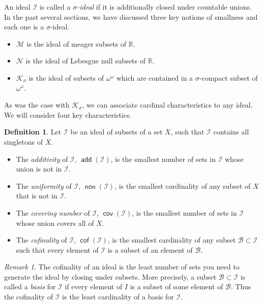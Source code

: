 \documentclass[11pt,oneside]{amsbook}
\newcommand{\R}{\mathbb R}
\newcommand{\Null}{\mathcal N}
\newcommand{\Meager}{\mathcal M}
\newcommand{\Ksigma}{\mathcal K_\sigma}
\DeclareMathOperator{\add}{\mathsf{add}}
\DeclareMathOperator{\non}{\mathsf{non}}
\DeclareMathOperator{\cov}{\mathsf{cov}}
\DeclareMathOperator{\cof}{\mathsf{cof}}
\theoremstyle{definition}
\theoremstyle{plain}
\theoremstyle{definition}
\newtheorem{definition}[theorem]{Definition}
\theoremstyle{remark}
\newtheorem{remark}[theorem]{Remark}
\numberwithin{equation}{section}
\numberwithin{figure}{section}
\begin{document}
An ideal $\mathcal I$ is called a \emph{$\sigma$-ideal} if it is additionally closed under countable unions. In the past several sections, we have discussed three key notions of smallness and each one is a $\sigma$-ideal.
\begin{itemize}
  \item $\Meager$ is the ideal of meager subsets of $\R$.
  \item $\Null$ is the ideal of Lebesgue null subsets of $\R$.
  \item $\Ksigma$ is the ideal of subsets of $\omega^\omega$ which are contained in a $\sigma$-compact subset of $\omega^\omega$.
\end{itemize}

As was the case with $\Ksigma$, we can associate cardinal characteristics to any ideal. We will consider four key characteristics.

\begin{definition} Let $\mathcal I$ be an ideal of subsets of a set $X$, such that $\mathcal I$ contains all singletons of $X$. 
  \begin{itemize}
  \item The \emph{additivity} of $\mathcal{I}$, $\add(\mathcal{I})$, is the smallest number of sets in $\mathcal{I}$ whose union is not in $\mathcal{I}$.
  \item The \emph{uniformity} of $\mathcal{I}$, $\non(\mathcal{I})$, is the smallest cardinality of any subset of $X$ that is not in $\mathcal{I}$.
  \item The \emph{covering number} of $\mathcal{I}$, $\cov(\mathcal{I})$, is the smallest number of sets in $\mathcal{I}$ whose union covers all of $X$.
  \item The \emph{cofinality} of $\mathcal{I}$, $\cof(\mathcal{I})$, is the smallest cardinality of any subset $\mathcal{B}\subset\mathcal{I}$ such that every element of $\mathcal{I}$ is a subset of an element of $\mathcal{B}$.
  \end{itemize}
\end{definition}

\begin{remark}
The cofinality of an ideal is the least number of sets you need to generate the ideal by closing under subsets. More precisely, a subset $\mathcal B\subset\mathcal I$ is called a \emph{basis} for $\mathcal I$ if every element of $I$ is a subset of some element of $\mathcal B$. Thus the cofinality of $\mathcal I$ is the least cardinality of a basis for $\mathcal I$.
\end{remark}
\end{document}

